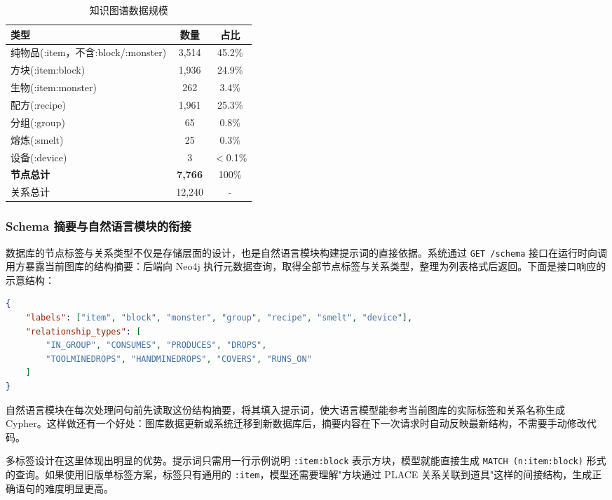 \documentclass[12pt,a4paper]{article}
\begin{document}
\begin{table}[H]
    \centering
    \caption{知识图谱数据规模}
    \label{tab:data-scale}
    \begin{tabular}{lcc}
        \toprule
        \textbf{类型} & \textbf{数量} & \textbf{占比} \\
        \midrule
        纯物品(:item，不含:block/:monster) & 3,514 & 45.2\% \\
        方块(:item:block) & 1,936 & 24.9\% \\
        生物(:item:monster) & 262 & 3.4\% \\
        配方(:recipe) & 1,961 & 25.3\% \\
        分组(:group) & 65 & 0.8\% \\
        熔炼(:smelt) & 25 & 0.3\% \\
        设备(:device) & 3 & $<$0.1\% \\
        \midrule
        \textbf{节点总计} & \textbf{7,766} & 100\% \\
        \midrule
        关系总计 & 12,240 & - \\
        \bottomrule
    \end{tabular}
\end{table}

\subsubsection{Schema 摘要与自然语言模块的衔接}

数据库的节点标签与关系类型不仅是存储层面的设计，也是自然语言模块构建提示词的直接依据。系统通过 \texttt{GET /schema} 接口在运行时向调用方暴露当前图库的结构摘要：后端向 Neo4j 执行元数据查询，取得全部节点标签与关系类型，整理为列表格式后返回。下面是接口响应的示意结构：

\begin{lstlisting}[language=json, caption={\texttt{GET /schema} 响应示例}]
{
    "labels": ["item", "block", "monster", "group", "recipe", "smelt", "device"],
    "relationship_types": [
        "IN_GROUP", "CONSUMES", "PRODUCES", "DROPS",
        "TOOLMINEDROPS", "HANDMINEDROPS", "COVERS", "RUNS_ON"
    ]
}
\end{lstlisting}

自然语言模块在每次处理问句前先读取这份结构摘要，将其填入提示词，使大语言模型能参考当前图库的实际标签和关系名称生成 Cypher。这样做还有一个好处：图库数据更新或系统迁移到新数据库后，摘要内容在下一次请求时自动反映最新结构，不需要手动修改代码。

多标签设计在这里体现出明显的优势。提示词只需用一行示例说明 \texttt{:item:block} 表示方块，模型就能直接生成 \texttt{MATCH (n:item:block)} 形式的查询。如果使用旧版单标签方案，标签只有通用的 \texttt{:item}，模型还需要理解"方块通过 PLACE 关系关联到道具"这样的间接结构，生成正确语句的难度明显更高。
\end{document}
